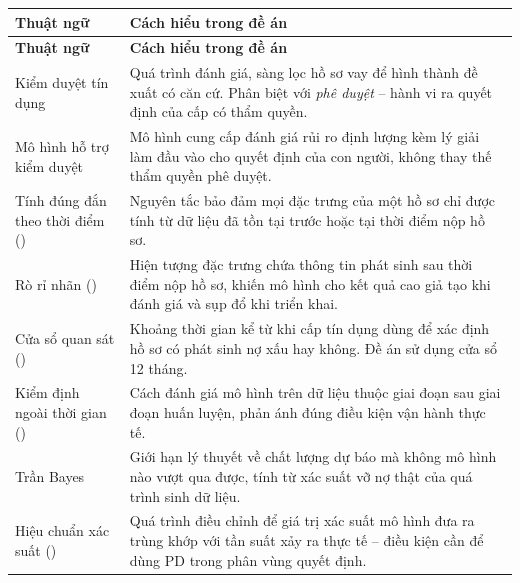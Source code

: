 \begingroup
\small
\begin{longtable}{@{}L{4.4cm}L{9.6cm}@{}}
\toprule
\textbf{Thuật ngữ} & \textbf{Cách hiểu trong đề án} \\
\midrule
\endfirsthead
\toprule
\textbf{Thuật ngữ} & \textbf{Cách hiểu trong đề án} \\
\midrule
\endhead
\bottomrule
\endlastfoot

Kiểm duyệt tín dụng &
Quá trình đánh giá, sàng lọc hồ sơ vay để hình thành đề xuất có căn cứ. Phân biệt
với \textit{phê duyệt} -- hành vi ra quyết định của cấp có thẩm quyền. \\

Mô hình hỗ trợ kiểm duyệt &
Mô hình cung cấp đánh giá rủi ro định lượng kèm lý giải làm đầu vào cho quyết
định của con người, không thay thế thẩm quyền phê duyệt. \\

Tính đúng đắn theo thời điểm \newline () &
Nguyên tắc bảo đảm mọi đặc trưng của một hồ sơ chỉ được tính từ dữ liệu đã tồn
tại trước hoặc tại thời điểm nộp hồ sơ. \\

Rò rỉ nhãn \newline () &
Hiện tượng đặc trưng chứa thông tin phát sinh sau thời điểm nộp hồ sơ, khiến mô
hình cho kết quả cao giả tạo khi đánh giá và sụp đổ khi triển khai. \\

Cửa sổ quan sát \newline () &
Khoảng thời gian kể từ khi cấp tín dụng dùng để xác định hồ sơ có phát sinh nợ
xấu hay không. Đề án sử dụng cửa sổ 12 tháng. \\

Kiểm định ngoài thời gian \newline () &
Cách đánh giá mô hình trên dữ liệu thuộc giai đoạn sau giai đoạn huấn luyện, phản
ánh đúng điều kiện vận hành thực tế. \\

Trần Bayes &
Giới hạn lý thuyết về chất lượng dự báo mà không mô hình nào vượt qua được, tính
từ xác suất vỡ nợ thật của quá trình sinh dữ liệu. \\

Hiệu chuẩn xác suất \newline () &
Quá trình điều chỉnh để giá trị xác suất mô hình đưa ra trùng khớp với tần suất
xảy ra thực tế -- điều kiện cần để dùng PD trong phân vùng quyết định. \\


\end{longtable}
